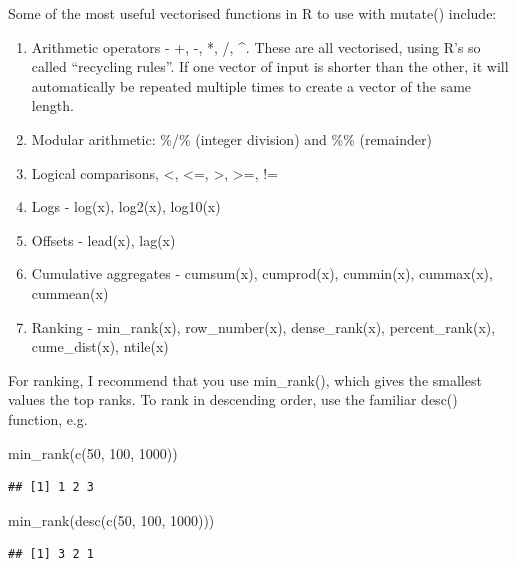 \documentclass[
]{article}
\newenvironment{Shaded}{\begin{snugshade}}{\end{snugshade}}
\newcommand{\DecValTok}[1]{\textcolor[rgb]{0.00,0.00,0.81}{#1}}
\newcommand{\FunctionTok}[1]{\textcolor[rgb]{0.00,0.00,0.00}{#1}}
\newcommand{\NormalTok}[1]{#1}
\providecommand{\tightlist}{%
  \setlength{\itemsep}{0pt}\setlength{\parskip}{0pt}}
\begin{document}
Some of the most useful vectorised functions in R to use with mutate()
include:

\begin{enumerate}
\def\labelenumi{\arabic{enumi}.}
\tightlist
\item
  Arithmetic operators - +, -, *, /, \^{}. These are all vectorised,
  using R's so called ``recycling rules''. If one vector of input is
  shorter than the other, it will automatically be repeated multiple
  times to create a vector of the same length.
\item
  Modular arithmetic: \%/\% (integer division) and \%\% (remainder)
\item
  Logical comparisons, \textless, \textless=, \textgreater,
  \textgreater=, !=
\item
  Logs - log(x), log2(x), log10(x)
\item
  Offsets - lead(x), lag(x)
\item
  Cumulative aggregates - cumsum(x), cumprod(x), cummin(x), cummax(x),
  cummean(x)
\item
  Ranking - min\_rank(x), row\_number(x), dense\_rank(x),
  percent\_rank(x), cume\_dist(x), ntile(x)
\end{enumerate}

For ranking, I recommend that you use min\_rank(), which gives the
smallest values the top ranks. To rank in descending order, use the
familiar desc() function, e.g.

\begin{Shaded}
\begin{Highlighting}[]
\FunctionTok{min\_rank}\NormalTok{(}\FunctionTok{c}\NormalTok{(}\DecValTok{50}\NormalTok{, }\DecValTok{100}\NormalTok{, }\DecValTok{1000}\NormalTok{))}
\end{Highlighting}
\end{Shaded}

\begin{verbatim}
## [1] 1 2 3
\end{verbatim}

\begin{Shaded}
\begin{Highlighting}[]
\FunctionTok{min\_rank}\NormalTok{(}\FunctionTok{desc}\NormalTok{(}\FunctionTok{c}\NormalTok{(}\DecValTok{50}\NormalTok{, }\DecValTok{100}\NormalTok{, }\DecValTok{1000}\NormalTok{)))}
\end{Highlighting}
\end{Shaded}

\begin{verbatim}
## [1] 3 2 1
\end{verbatim}
\end{document}
